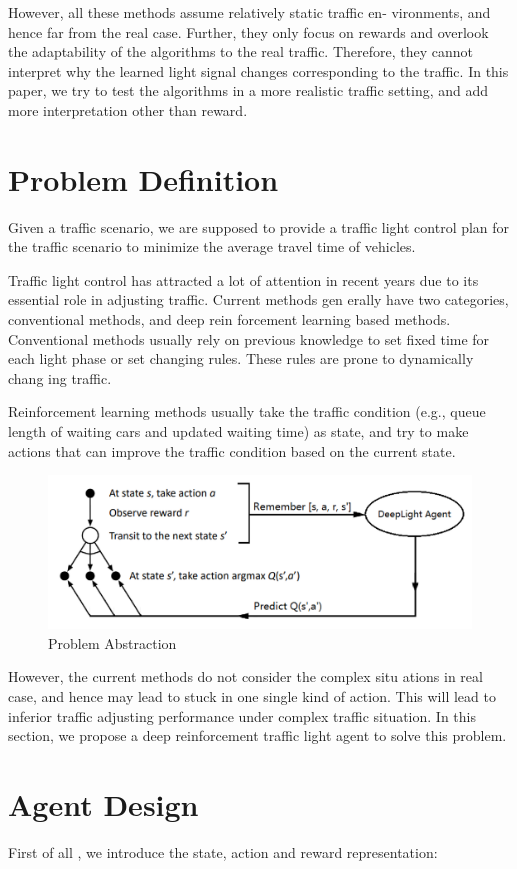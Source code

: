 \documentclass{article}
\begin{document}
However, all these methods assume relatively static traffic en-
vironments, and hence far from the real case. Further, they only
focus on rewards and overlook the adaptability of the algorithms
to the real traffic. Therefore, they cannot interpret why the learned
light signal changes corresponding to the traffic. In this paper, we
try to test the algorithms in a more realistic traffic setting, and add
more interpretation other than reward.

\section{Problem Definition}
\quad Given a traffic scenario, we are supposed to provide a traffic light control plan for the traffic scenario to minimize the average travel time of vehicles.


Traffic light control has attracted a lot of attention in recent years
due to its essential role in adjusting traffic. Current methods gen
erally have two categories, conventional methods, and deep rein
forcement learning based methods. Conventional methods usually
rely on previous knowledge to set fixed time for each light phase
or set changing rules. These rules are prone to dynamically chang
ing traffic. 

Reinforcement learning methods usually take the traffic
condition (e.g., queue length of waiting cars and updated waiting
time) as state, and try to make actions that can improve the traffic
condition based on the current state.

\begin{figure}[H]
\centering
\includegraphics[width=.4\textwidth]{d1.png}
\caption{Problem Abstraction}
\end{figure}

However, the current methods do not consider the complex situ
ations in real case, and hence may lead to stuck in one single kind
of action. This will lead to inferior traffic adjusting performance
under complex traffic situation.
In this section, we propose a deep reinforcement traffic light
agent to solve this problem. 

\section{Agent Design}
\quad First of all , we introduce the state, action and reward representation:
 
\end{document}
